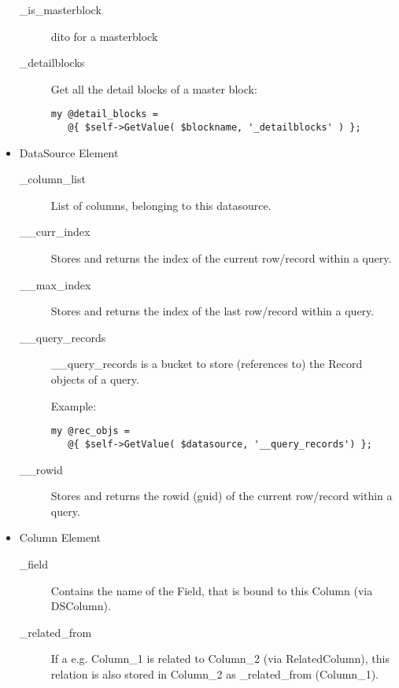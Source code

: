 \documentclass[a4paper,11pt]{scrartcl}
\begin{document}
\begin{itemize}
\begin{description}
         \item[\_is\_masterblock]
            dito for a masterblock
         \item[\_detailblocks]
            Get all the detail blocks of a master block:

            \verb+my @detail_blocks =+ \\
            \verb+   @{ $self->GetValue( $blockname, '_detailblocks' ) };+

      \end{description}

   \item DataSource Element
      \begin{description}
         \item[\_column\_list]
            List of columns, belonging to this datasource.
         \item[\_\_curr\_index]
            Stores and returns the index of the current row/record within a
            query.
         \item[\_\_max\_index]
            Stores and returns the index of the last row/record within a
            query. 
         \item[\_\_query\_records]
            \_\_query\_records is a bucket to store (references to) the Record objects
            of a query.

            Example:

            \verb+my @rec_objs =+ \\
            \verb+   @{ $self->GetValue( $datasource, '__query_records') };+

         \item[\_\_rowid]
            Stores and returns the rowid (guid) of the current row/record within a
            query.
      \end{description}

   \item Column Element
      \begin{description}
         \item[\_field]
            Contains the name of the Field, that is bound to this Column
            (via DSColumn).
         \item[\_related\_from]
            If a e.g. Column\_1 is related to Column\_2 (via RelatedColumn),
            this relation is also stored in Column\_2 as \_related\_from
            (Column\_1).
      \end{description}


\end{itemize}
\end{document}
